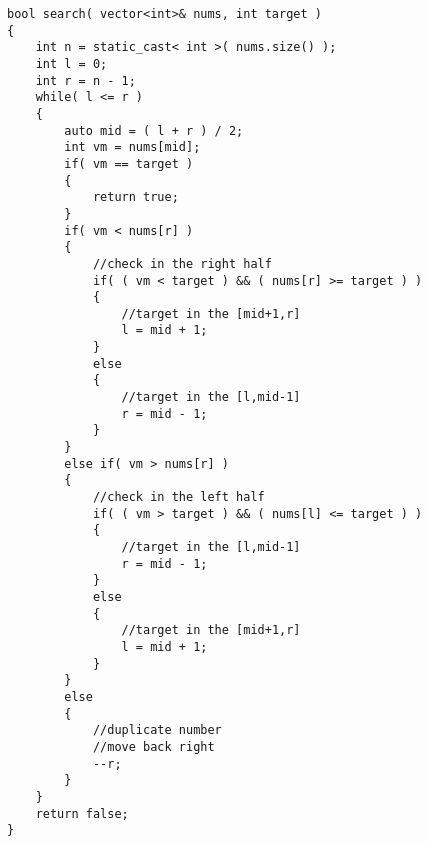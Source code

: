 \setcounter{lstlisting}{0}
\begin{lstlisting}[style=customc, caption={Binary Search}]
bool search( vector<int>& nums, int target )
{
    int n = static_cast< int >( nums.size() );
    int l = 0;
    int r = n - 1;
    while( l <= r )
    {
        auto mid = ( l + r ) / 2;
        int vm = nums[mid];
        if( vm == target )
        {
            return true;
        }
        if( vm < nums[r] )
        {
            //check in the right half
            if( ( vm < target ) && ( nums[r] >= target ) )
            {
                //target in the [mid+1,r]
                l = mid + 1;
            }
            else
            {
                //target in the [l,mid-1]
                r = mid - 1;
            }
        }
        else if( vm > nums[r] )
        {
            //check in the left half
            if( ( vm > target ) && ( nums[l] <= target ) )
            {
                //target in the [l,mid-1]
                r = mid - 1;
            }
            else
            {
                //target in the [mid+1,r]
                l = mid + 1;
            }
        }
        else
        {
            //duplicate number
            //move back right
            --r;
        }
    }
    return false;
}
\end{lstlisting}